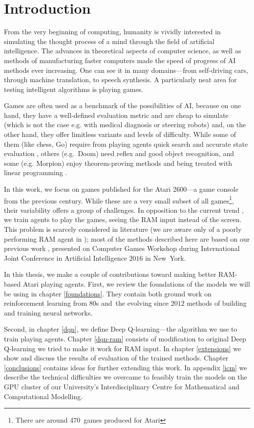 \chapter*{Introduction}
From the very beginning of computing, humanity is vividly interested in simulating the thought process of a mind through the field of artificial intelligence. The advances in theoretical aspects of computer science, as well as methods of manufacturing faster computers made the speed of progress of AI methods ever increasing. One can see it in many domains---from self-driving cars, through machine translation, to speech synthesis. A particularly neat area for testing intelligent algorithms is playing games.

Games are often used as a benchmark of the possibilities of AI, because on one hand, they have a well-defined evaluation metric and are cheap to simulate (which is not the case e.g. with medical diagnosis or steering robots) and, on the other hand, they offer limitless variants and levels of difficulty. While some of them (like chess, Go) require from playing agents quick search and accurate state evaluation \cite{alphago}, others (e.g.~Doom) need reflex and good object recognition, and some (e.g. Morpion) enjoy theorem-proving methods and being treated with linear programming \cite{morpion}.

In this work, we focus on games published for the Atari 2600---a game console from the previous century. While these are a very small subset of all games\footnote{There are around 470~games produced for Atari}, their variability offers a group of challenges. In opposition to the current trend \cite{nips-dqn, nature-dqn, a3c}, we train agents to play the games, seeing the RAM input instead of the screen. This problem is scarcely considered in literature (we are aware only of a poorly performing RAM agent in \cite{ale}); most of the methods described here are based on our previous work \cite{our-paper}, presented on Computer Games Workshop during International Joint Conference in Artificial Intelligence $2016$ in New~York.

In this thesis, we make a couple of contributions toward making better RAM-based Atari playing agents. First, we review the foundations of the models we will be using in chapter \ref{foundations}. They contain both ground work on reinforcement learning from 80s and~the evolving since $2012$ methods of building and training neural networks.

Second, in chapter \ref{dqn}, we define Deep Q-learning---the algorithm we use to train playing agents.
Chapter \ref{dqn-ram} consists of modification to original Deep Q-learning we tried to make it work for RAM input.
In chapter \ref{extensions} we show and discuss the results of evaluation of the trained methods.
Chapter \ref{conclusions} contains ideas for further extending this work.
In appendix \ref{icm} we describe the technical difficulties we overcame to feasibly train the models on the GPU cluster of our University's Interdisciplinary Centre for Mathematical and Computational Modelling.
\iffalse
\section*{Acknowledgements}
\addcontentsline{toc}{section}{Acknowledgements}
First of all, I would like to thank dr~hab. Henryk~Michalewski 
\fi
{}
